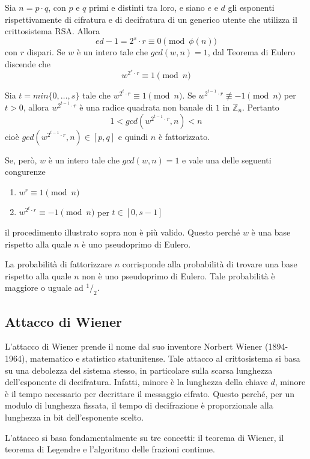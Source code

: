 Sia $n= p \cdot q$, con $p$ e $q$ primi e distinti tra loro, e siano $e$ e $d$ gli esponenti rispettivamente di cifratura e di decifratura di un generico utente che utilizza il crittosistema RSA. Allora \[ ed - 1 = 2^s \cdot r \equiv 0 \pmod{\phi(n)} \] con $r$ dispari. Se $w$ è un intero tale che $gcd(w, n) = 1$, dal Teorema di Eulero discende che \[ w^{2^s \cdot r} \equiv 1 \pmod{n} \]

Sia $t = min\{0, \dotsc, s\}$ tale che $w^{2^t \cdot r} \equiv 1 \pmod{n}$. Se $w^{2^{t-1} \cdot r} \not\equiv -1 \pmod{n}$ per $t>0$, allora $w^{2^{t-1} \cdot r}$ è una radice quadrata non banale di $1$ in $\mathbb{Z}_n$. Pertanto \[ 1 < gcd(w^{2^{t-1} \cdot r}, n) < n \] cioè $gcd(w^{2^{t-1} \cdot r}, n) \in [p, q]$ e quindi $n$ è fattorizzato.

Se, però, $w$ è un intero tale che $gcd(w, n) = 1$ e vale una delle seguenti congurenze
\begin{enumerate}
	\item $w^r \equiv 1 \pmod{n}$
	\item $w^{2^t \cdot r} \equiv -1 \pmod{n}$ per $t \in [0, s-1]$
\end{enumerate}
il procedimento illustrato sopra non è più valido. Questo perché $w$ è una base rispetto alla quale $n$ è uno pseudoprimo di Eulero.

La probabilità di fattorizzare $n$ corrisponde alla probabilità di trovare una base rispetto alla quale $n$ non è uno pseudoprimo di Eulero. Tale probabilità è maggiore o uguale ad $^1/_2$.



%
\subsection{Attacco di Wiener}
%

L'attacco di Wiener prende il nome dal suo inventore Norbert Wiener (1894-1964), matematico e statistico statunitense. Tale attacco al crittosistema si basa su una debolezza del sistema stesso, in particolare sulla scarsa lunghezza dell'esponente di decifratura. Infatti, minore è la lunghezza della chiave $d$, minore è il tempo necessario per decrittare il messaggio cifrato. Questo perché, per un modulo di lunghezza fissata, il tempo di decifrazione è proporzionale alla lunghezza in bit dell'esponente scelto.

%
%
%
L'attacco si basa fondamentalmente su tre concetti: il teorema di Wiener, il teorema di Legendre e l'algoritmo delle frazioni continue.

